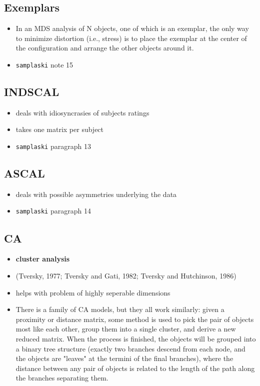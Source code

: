 \documentclass[11pt]{article}
\begin{document}
{{\subsection{Exemplars}
\label{sec-22-8}
\begin{itemize}
\item In an MDS analysis of N objects, one of which is an exemplar,
the only way to minimize distortion (i.e., stress) is to place
the exemplar at the center of the configuration and arrange the
other objects around it.
\item \texttt{samplaski} note 15
\end{itemize}

\subsection{INDSCAL}
\label{sec-22-9}
\begin{itemize}
\item deals with idiosyncrasies of subjects ratings
\item takes one matrix per subject
\item \texttt{samplaski} paragraph 13
\end{itemize}

\subsection{ASCAL}
\label{sec-22-10}
\begin{itemize}
\item deals with possible asymmetries underlying the data
\item \texttt{samplaski} paragraph 14
\end{itemize}

\subsection{CA}
\label{sec-22-11}
\begin{itemize}
\item \textbf{cluster analysis}
\item (Tversky, 1977; Tversky and Gati, 1982; Tversky and
Hutchinson, 1986)
\item helps with problem of highly seperable dimensions
\item There is a family of CA models, but they all work similarly:
given a proximity or distance matrix, some method is used to
pick the pair of objects most like each other, group them into a
single cluster, and derive a new reduced matrix. When the
process is finished, the objects will be grouped into a binary
tree structure (exactly two branches descend from each node, and
the objects are "leaves" at the termini of the final branches),
where the distance between any pair of objects is related to the
length of the path along the branches separating them.
\end{itemize}

}}
\end{document}
